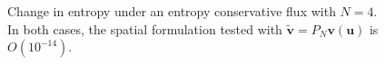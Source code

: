 \documentclass[compress]{beamer}
\newcommand{\logLogSlopeTriangleFlip}[5]
{

    \pgfplotsextra
    {
        \pgfkeysgetvalue{/pgfplots/xmin}{\xmin}
        \pgfkeysgetvalue{/pgfplots/xmax}{\xmax}
        \pgfkeysgetvalue{/pgfplots/ymin}{\ymin}
        \pgfkeysgetvalue{/pgfplots/ymax}{\ymax}

        \pgfmathsetmacro{\xBrel}{#1-#2}
        \pgfmathsetmacro{\yBrel}{#3}
        \pgfmathsetmacro{\xCrel}{#1}

        \pgfmathsetmacro{\lnxB}{\xmin*(1-(#1-#2))+\xmax*(#1-#2)} %
        \pgfmathsetmacro{\lnxA}{\xmin*(1-#1)+\xmax*#1} %
        \pgfmathsetmacro{\lnyA}{\ymin*(1-#3)+\ymax*#3} %
        \pgfmathsetmacro{\lnyC}{\lnyA+#4*(\lnxA-\lnxB)}
        \pgfmathsetmacro{\yCrel}{\lnyC-\ymin)/(\ymax-\ymin)} %

        \pgfmathsetmacro{\xArel}{\xBrel}
        \pgfmathsetmacro{\yArel}{\yCrel}

        \coordinate (A) at (rel axis cs:\xArel,\yArel);
        \coordinate (B) at (rel axis cs:\xBrel,\yBrel);
        \coordinate (C) at (rel axis cs:\xCrel,\yCrel);

        \draw[#5]   (A)-- node[pos=0.5,anchor=east] {#4}
                    (B)-- 
                    (C)-- %
                    cycle;
    }
}
\theoremstyle{plain}
\renewcommand{\tilde}{\widetilde}
\newcommand{\LRp}[1]{\left( #1 \right)}
\begin{document}
{\begin{figure}
{
}
%
%
%
\caption{Change in entropy under an entropy conservative flux with $N=4$.  In both cases, the spatial formulation tested with $\tilde{\bm{v}} = P_N\bm{v}(\bm{u})$ is $O\LRp{10^{-14}}$. }
\end{figure}
}





{\scriptsize

}
\end{document}
